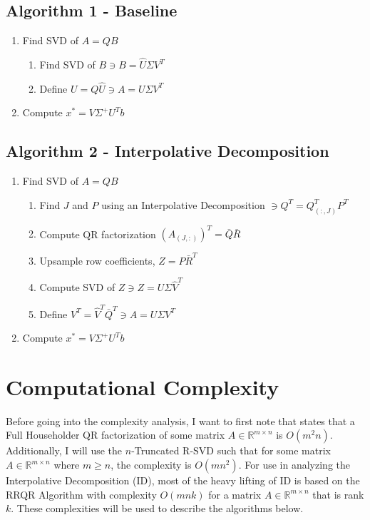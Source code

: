 \documentclass{article}[11pt]
\begin{document}
   \subsection{Algorithm 1 - Baseline}
   \begin{enumerate}
   \item Find SVD of $A = QB$
   		\begin{enumerate}
   		\item Find SVD of $B \ni B = \hat{U}\Sigma V^T$
   		\item Define $U = Q\hat{U} \ni A = U \Sigma V^T$ 
   		\end{enumerate}
   \item Compute $x^* = V \Sigma^{+} U^T b$
   \end{enumerate}
   
   \subsection{Algorithm 2 - Interpolative Decomposition}
   \begin{enumerate}
   \item Find SVD of $A = QB$
   		\begin{enumerate}
   		\item Find $J$ and $P$ using an Interpolative Decomposition $\ni Q^{T} = Q^{T}_{(:,J)}P^T$
   		\item Compute QR factorization $(A_{(J,:)})^T = \bar{Q}\bar{R}$
   		\item Upsample row coefficients, $Z = P\bar{R}^T$
   		\item Compute SVD of $Z \ni Z = U \Sigma \hat{V}^T$
   		\item Define $V^T = \hat{V}^T \bar{Q}^T \ni A = U \Sigma V^T$
   		\end{enumerate}
   \item Compute $x^* = V \Sigma^{+} U^T b$
   \end{enumerate}
   
   \newpage
   \section{Computational Complexity}
   Before going into the complexity analysis, I want to first note that \cite{labook} states that a Full Householder QR factorization of some matrix $A \in \mathbb{R}^{m \times n}$ is $O(m^2n)$. Additionally, I will use the $n$-Truncated R-SVD such that for some matrix $A \in \mathbb{R}^{m \times n}$ where $m \geq n$, the complexity is $O(mn^2)$. For use in analyzing the Interpolative Decomposition (ID), most of the heavy lifting of ID is based on the RRQR Algorithm with complexity $O(mnk)$ for a matrix $A \in \mathbb{R}^{m \times n}$ that is rank $k$. These complexities will be used to describe the algorithms below.
   
\end{document}
